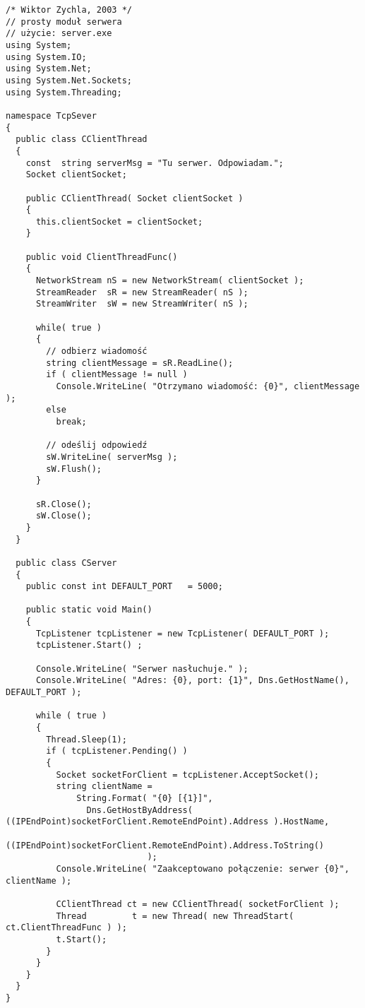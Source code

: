 \begin{scriptsize}
\begin{verbatim}
/* Wiktor Zychla, 2003 */
// prosty moduł serwera
// użycie: server.exe
using System;
using System.IO;
using System.Net;
using System.Net.Sockets;
using System.Threading;

namespace TcpSever
{
  public class CClientThread
  {
    const  string serverMsg = "Tu serwer. Odpowiadam.";
    Socket clientSocket;

    public CClientThread( Socket clientSocket )
    {
      this.clientSocket = clientSocket;
    }

    public void ClientThreadFunc()
    {
      NetworkStream nS = new NetworkStream( clientSocket );
      StreamReader  sR = new StreamReader( nS );
      StreamWriter  sW = new StreamWriter( nS );

      while( true )
      {
        // odbierz wiadomość
        string clientMessage = sR.ReadLine();
        if ( clientMessage != null )
          Console.WriteLine( "Otrzymano wiadomość: {0}", clientMessage );
        else
          break;

        // odeślij odpowiedź
        sW.WriteLine( serverMsg );
        sW.Flush();
      }

      sR.Close();
      sW.Close();
    }
  }

  public class CServer
  {
    public const int DEFAULT_PORT   = 5000;
 
    public static void Main()
    {     
      TcpListener tcpListener = new TcpListener( DEFAULT_PORT );
      tcpListener.Start() ;
	 
      Console.WriteLine( "Serwer nasłuchuje." );
      Console.WriteLine( "Adres: {0}, port: {1}", Dns.GetHostName(), DEFAULT_PORT );

      while ( true )
      {
        Thread.Sleep(1);
        if ( tcpListener.Pending() )
        {
          Socket socketForClient = tcpListener.AcceptSocket();
          string clientName = 
              String.Format( "{0} [{1}]",
                Dns.GetHostByAddress( ((IPEndPoint)socketForClient.RemoteEndPoint).Address ).HostName,
                ((IPEndPoint)socketForClient.RemoteEndPoint).Address.ToString()
				            );
          Console.WriteLine( "Zaakceptowano połączenie: serwer {0}", clientName );

          CClientThread ct = new CClientThread( socketForClient );
          Thread         t = new Thread( new ThreadStart( ct.ClientThreadFunc ) );
          t.Start();
        }
      }
    }
  }
}
\end{verbatim}
\end{scriptsize}

